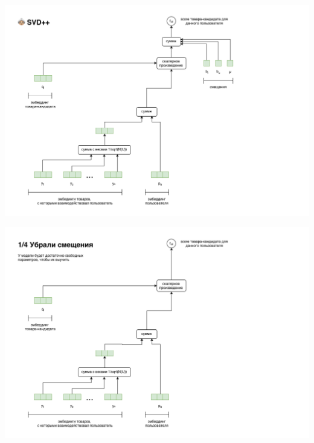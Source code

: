 \documentclass[11pt,aspectratio=169]{beamer}
\begin{document}
\begin{frame}

\begin{center}
\includegraphics[scale=0.3]{images/svdpp.png}
\end{center}

\end{frame}

\begin{frame}

\begin{center}
\includegraphics[scale=0.3]{images/svdpp-bias.png}
\end{center}

\end{frame}
\end{document}
